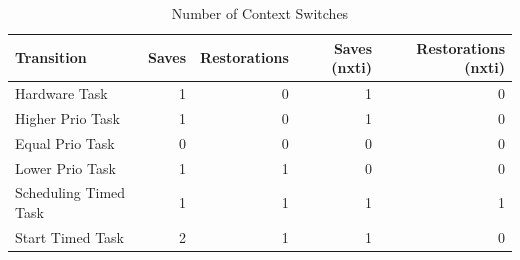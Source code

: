 \begin{table}
  \centerfloat
  \begin{tabular}{ l r r r r }
    \toprule
    Transition & Saves & Restorations & Saves (nxti) & Restorations (nxti) \\
    \midrule
    Hardware Task & 1 & 0 & 1 & 0\\
    Higher Prio Task & 1 & 0 & 1 & 0 \\
    Equal Prio Task & 0 & 0 & 0 & 0 \\
    Lower Prio Task & 1 & 1 & 0 & 0\\
    Scheduling Timed Task & 1 & 1 & 1 & 1\\
    Start Timed Task & 2 & 1 & 1 & 0 \\
    \bottomrule
  \end{tabular}
  \caption{Number of Context Switches}%
  \label{tbl:nr_of_context_switches}
\end{table}